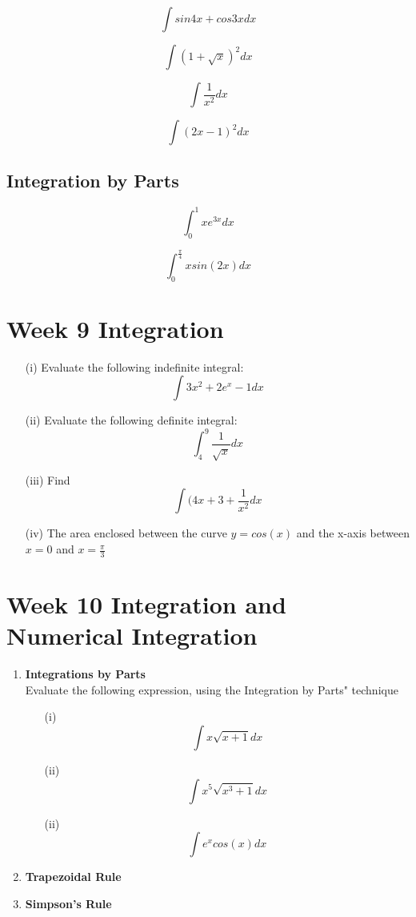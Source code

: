 \documentclass[]{article}
\begin{document}
\[  \int sin 4x + cos 3x dx \]

\[ \int (1+ \sqrt{x})^2 dx \]

\[ \int  \frac{1}{x^2} dx  \]

\[ \int (2x-1)^2 dx  \]

\subsection*{Integration by Parts}
\[  \int^{1}_{0} x e^{3x} dx \]

\[  \int^{\frac{\pi}{4}}_{0} x sin (2x) dx \]


\newpage
\section{Week 9 Integration}
\begin{itemize}
\item[(i)] 
Evaluate the following indefinite integral: 
\[\int 3x^2 +2e^x -1 dx\] 
\item[(ii)] Evaluate the following definite integral: 
\[\int^{9}_{4} \frac{1}{\sqrt{x}} dx\] 
\item[(iii)] Find \[\int (4x +3 + \frac{1}{x^2} dx\]

\item[(iv)] The area enclosed between the curve $y=cos(x)$ and the x-axis between $x=0$ and $x= \frac{\pi}{3}$
\end{itemize}
\newpage
\section*{Week 10 Integration and Numerical Integration}

\begin{enumerate}
	\item \textbf{Integrations by Parts} \\ Evaluate the following expression, using the Integration by Parts" technique
	
	
	\begin{itemize}
		\item[(i)] \[ \int x \sqrt{x+1} dx \]
		\item[(ii)] \[ \int x^5 \sqrt{x^3+1} dx \]
		\item[(ii)] \[ \int e^x cos(x) dx \]
	\end{itemize}
	\item \textbf{Trapezoidal Rule}
	\item \textbf{Simpson's Rule}
\end{enumerate}
\newpage
\end{document}
